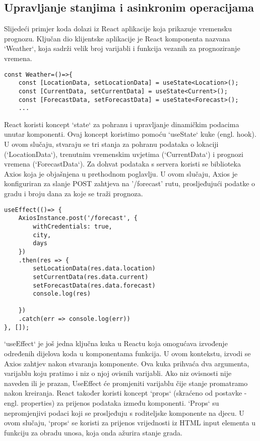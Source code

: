\documentclass[times, utf8, zavrsni]{fer}
\begin{document}
\subsection{Upravljanje stanjima i asinkronim operacijama}
Slijedeći primjer koda dolazi iz React aplikacije koja prikazuje vremensku prognozu. Ključan dio klijentske aplikacije je React komponenta nazvana `Weather`, koja sadrži velik broj varijabli i funkcija vezanih za prognoziranje vremena.

\begin{verbatim}
const Weather=()=>{
    const [LocationData, setLocationData] = useState<Location>();
    const [CurrentData, setCurrentData] = useState<Current>();
    const [ForecastData, setForecastData] = useState<Forecast>();
    ...
\end{verbatim}
React koristi koncept `state` za pohranu i upravljanje dinamičkim podacima unutar komponenti. Ovaj koncept koristimo pomoću `useState` kuke (engl. hook). U ovom slučaju, stvaraju se tri stanja za pohranu podataka o lokaciji (`LocationData`), trenutnim vremenskim uvjetima (`CurrentData`) i prognozi vremena (`ForecastData`). 
Za dohvat podataka s servera koristi se biblioteka Axios koja je objašnjena u prethodnom poglavlju. U ovom slučaju, Axios je konfiguriran za slanje POST zahtjeva na '/forecast' rutu, prosljeđujući podatke o gradu i broju dana za koje se traži prognoza. 

\begin{verbatim}
useEffect(()=> {
    AxiosInstance.post('/forecast', {
        withCredentials: true,
        city,
        days
    })
    .then(res => {
        setLocationData(res.data.location)
        setCurrentData(res.data.current)
        setForecastData(res.data.forecast)
        console.log(res)

    })
    .catch(err => console.log(err))
}, []);
\end{verbatim}
`useEffect` je još jedna ključna kuka u Reactu koja omogućava izvođenje određenih dijelova koda u komponentama funkcija. U ovom kontekstu, izvodi se Axios zahtjev nakon stvaranja komponente. Ova kuka prihvaća dva argumenta, varijablu koju pratimo i niz o njoj ovisnih varijabli. Ako niz ovisnosti nije naveden ili je prazan, UseEffect će promjeniti varijablu čije stanje promatramo nakon kreiranja. React također koristi koncept `props` (skraćeno od postavke - engl. properties) za prijenos podataka između komponenti. `Props` su nepromjenjivi podaci koji se prosljeđuju s roditeljske komponente na djecu. U ovom slučaju, `props` se koristi za prijenos vrijednosti iz HTML input elementa u funkciju za obradu unosa, koja onda ažurira stanje grada.
\end{document}
